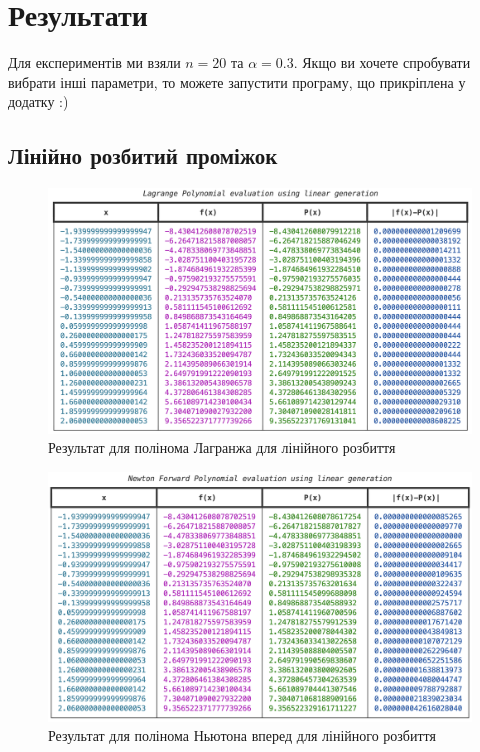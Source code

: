 \documentclass[12pt]{extarticle}
\begin{document}
\pagebreak

\section{Результати}

Для експериментів ми взяли $n=20$ та $\alpha=0.3$. Якщо ви хочете спробувати вибрати інші параметри, то можете запустити програму, що прикріплена у додатку :)

\subsection{Лінійно розбитий проміжок}
\begin{figure}[H]
    \centering
    \includegraphics[width=\textwidth]{images/lab_1/lagrange_linear.png}
    \caption{Результат для полінома Лагранжа для лінійного розбиття}
    \label{fig:6}
\end{figure}
\vspace{5px}

\begin{figure}[H]
    \centering
    \includegraphics[width=\textwidth]{images/lab_1/newton_forw_linear.png}
    \caption{Результат для полінома Ньютона вперед для лінійного розбиття}
    \label{fig:6}
\end{figure}
\vspace{5px}
\end{document}
